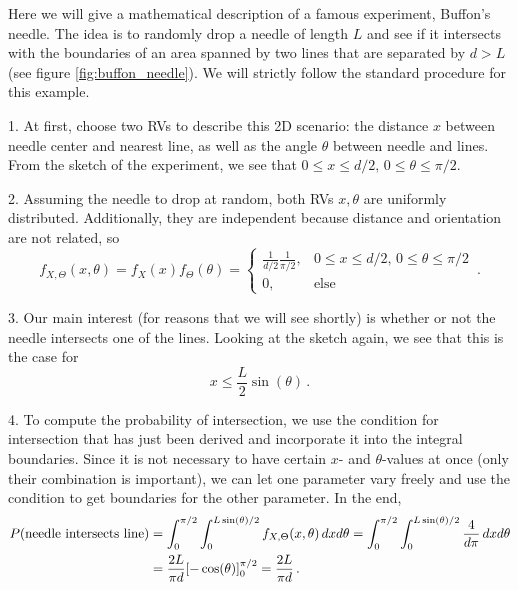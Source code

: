 \begin{ex}
Here we will give a mathematical description of a famous experiment, Buffon's needle. The idea is to randomly drop a needle of length $L$ and see if it intersects with the boundaries of an area spanned by two lines that are separated by $d > L$ (see figure \ref{fig:buffon_needle}). We will strictly follow the standard procedure for this example.

1. At first, choose two RVs to describe this 2D scenario: the distance $x$ between needle center and nearest line, as well as the angle $\theta$ between needle and lines. From the sketch of the experiment, we see that $0 \leq x \leq d / 2, \, 0 \leq \theta \leq \pi / 2$.

2. Assuming the needle to drop at random, both RVs $x, \theta$ are uniformly distributed. Additionally, they are independent because distance and orientation are not related, so
\begin{equation*}
f_{X, \Theta}(x, \theta) = f_X(x) f_\Theta(\theta) = \begin{cases} \frac{1}{d / 2} \frac{1}{\pi / 2}, & 0 \leq x \leq d / 2, \, 0 \leq \theta \leq \pi / 2 \\ 0, & \text{else} \end{cases} \, .
\end{equation*}

3. Our main interest (for reasons that we will see shortly) is whether or not the needle intersects one of the lines. Looking at the sketch again, we see that this is the case for
\begin{equation*}
x \leq \frac{L}{2} \sin(\theta) \, .
\end{equation*}

4. To compute the probability of intersection, we use the condition for intersection that has just been derived and incorporate it into the integral boundaries. Since it is not necessary to have certain $x$- and $\theta$-values at once (only their combination is important), we can let one parameter vary freely and use the condition to get boundaries for the other parameter. In the end,
\begin{align*}
P(\text{needle intersects line}) &= \int_0^{\pi / 2} \int_0^{L \sin(\theta) / 2} f_{X, \Theta}(x, \theta) \, dx d\theta = \int_0^{\pi / 2} \int_0^{L \sin(\theta) / 2} \frac{4}{d \pi} \, dx d\theta
\\
&= \frac{2 L}{\pi d} \qty[-\cos(\theta)]_0^{\pi / 2} = \frac{2 L}{\pi d} \, .
\end{align*}


\end{ex}
